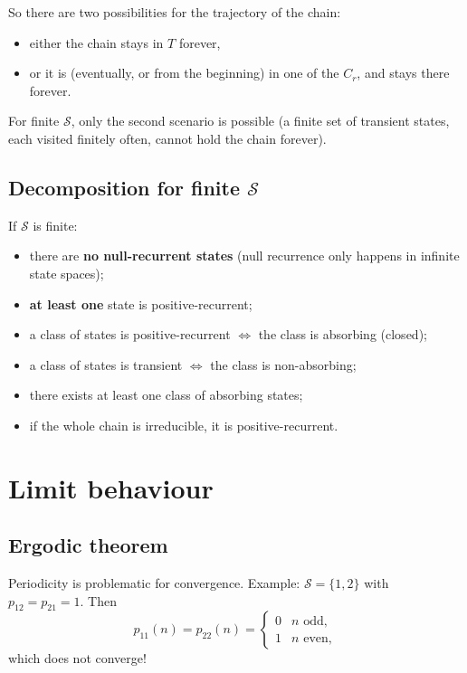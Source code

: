 So there are two possibilities for the trajectory of the chain:
\begin{itemize}
    \item either the chain stays in $T$ forever,
    \item or it is (eventually, or from the beginning) in one of the $C_r$, and stays there forever.
\end{itemize}
For finite $\mathcal{S}$, only the second scenario is possible (a finite set of transient states, each visited finitely often, cannot hold the chain forever).

\subsection{Decomposition for finite $\mathcal{S}$}

If $\mathcal{S}$ is finite:
\begin{itemize}
    \item there are \textbf{no null-recurrent states} (null recurrence only happens in infinite state spaces);
    \item \textbf{at least one} state is positive-recurrent;
    \item a class of states is positive-recurrent $\iff$ the class is absorbing (closed);
    \item a class of states is transient $\iff$ the class is non-absorbing;
    \item there exists at least one class of absorbing states;
    \item if the whole chain is irreducible, it is positive-recurrent.
\end{itemize}

\section{Limit behaviour}

\subsection{Ergodic theorem}

Periodicity is problematic for convergence. Example: $\mathcal{S} = \{1, 2\}$ with $p_{12} = p_{21} = 1$. Then
\[
p_{11}(n) = p_{22}(n) = \begin{cases} 0 & n \text{ odd}, \\ 1 & n \text{ even}, \end{cases}
\]
which does not converge!

